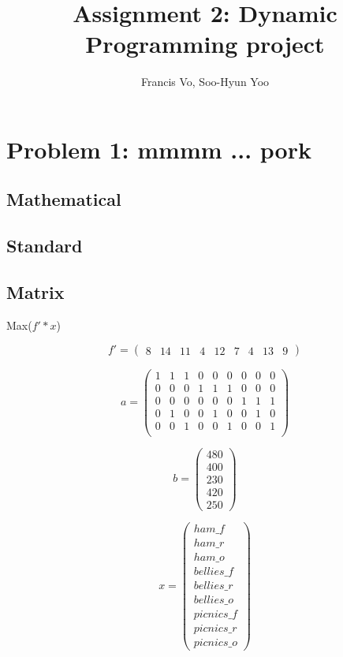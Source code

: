 \documentclass[a4paper,10pt]{article}
\title{Assignment 2: Dynamic Programming project}
\author{Francis Vo, Soo-Hyun Yoo}
\begin{document}
	\maketitle

	\section{Problem 1: mmmm ... pork}
	\subsection{Mathematical}
	\subsection{Standard}
	\subsection{Matrix}
	Max($f'*x$)
	
	\[ f' = \left( \begin{array}{ccccccccc}
	8 & 14 & 11 & 
	4 & 12 & 7 & 
	4 & 13 & 9  
	\end{array} \right)\]
	

	\[ a = \left( \begin{array}{ccccccccc}
	1 & 1 & 1 & 0 & 0 & 0 & 0 & 0 & 0 \\
	0 & 0 & 0 & 1 & 1 & 1 & 0 & 0 & 0 \\
	0 & 0 & 0 & 0 & 0 & 0 & 1 & 1 & 1 \\
	0 & 1 & 0 & 0 & 1 & 0 & 0 & 1 & 0 \\
	0 & 0 & 1 & 0 & 0 & 1 & 0 & 0 & 1 \\
	\end{array} \right)\]
	
	\[ b = \left( \begin{array}{c}
	480\\
	400\\
	230\\
	420\\
	250
	\end{array} \right)\]
	

	\[ x = \left( \begin{array}{c}
	ham\_f\\
	ham\_r\\
	ham\_o\\
	bellies\_f\\
	bellies\_r\\
	bellies\_o\\
	picnics\_f\\
	picnics\_r\\
	picnics\_o
	\end{array} \right)\]
        
\end{document}
